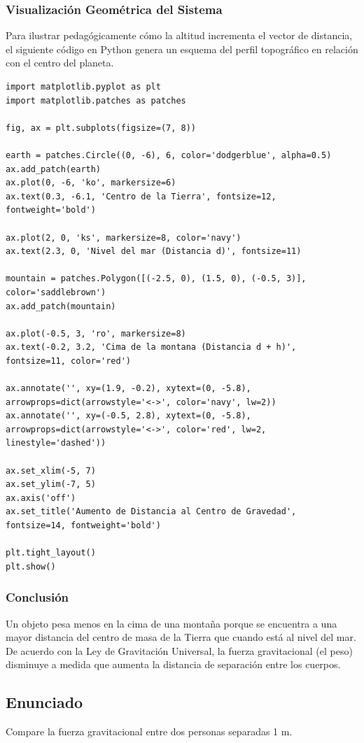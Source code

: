 \documentclass[12pt]{article}
\begin{document}
\subsubsection*{Visualización Geométrica del Sistema}
Para ilustrar pedagógicamente cómo la altitud incrementa el vector de distancia, el siguiente código en Python genera un esquema del perfil topográfico en relación con el centro del planeta.

\begin{lstlisting}
import matplotlib.pyplot as plt
import matplotlib.patches as patches

fig, ax = plt.subplots(figsize=(7, 8))

earth = patches.Circle((0, -6), 6, color='dodgerblue', alpha=0.5)
ax.add_patch(earth)
ax.plot(0, -6, 'ko', markersize=6)
ax.text(0.3, -6.1, 'Centro de la Tierra', fontsize=12, fontweight='bold')

ax.plot(2, 0, 'ks', markersize=8, color='navy')
ax.text(2.3, 0, 'Nivel del mar (Distancia d)', fontsize=11)

mountain = patches.Polygon([(-2.5, 0), (1.5, 0), (-0.5, 3)], color='saddlebrown')
ax.add_patch(mountain)

ax.plot(-0.5, 3, 'ro', markersize=8)
ax.text(-0.2, 3.2, 'Cima de la montana (Distancia d + h)', fontsize=11, color='red')

ax.annotate('', xy=(1.9, -0.2), xytext=(0, -5.8), arrowprops=dict(arrowstyle='<->', color='navy', lw=2))
ax.annotate('', xy=(-0.5, 2.8), xytext=(0, -5.8), arrowprops=dict(arrowstyle='<->', color='red', lw=2, linestyle='dashed'))

ax.set_xlim(-5, 7)
ax.set_ylim(-7, 5)
ax.axis('off')
ax.set_title('Aumento de Distancia al Centro de Gravedad', fontsize=14, fontweight='bold')

plt.tight_layout()
plt.show()
\end{lstlisting}

\subsubsection*{Conclusión}
Un objeto pesa menos en la cima de una montaña porque se encuentra a una mayor distancia del centro de masa de la Tierra que cuando está al nivel del mar. De acuerdo con la Ley de Gravitación Universal, la fuerza gravitacional (el peso) disminuye a medida que aumenta la distancia de separación entre los cuerpos.

\newpage

\subsection*{Enunciado}
Compare la fuerza gravitacional entre dos personas separadas 1 m.
\end{document}
